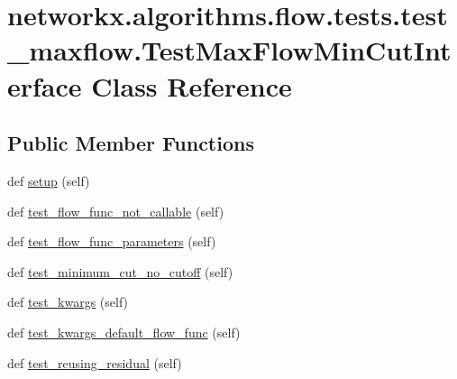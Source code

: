 \hypertarget{classnetworkx_1_1algorithms_1_1flow_1_1tests_1_1test__maxflow_1_1TestMaxFlowMinCutInterface}{}\section{networkx.\+algorithms.\+flow.\+tests.\+test\+\_\+maxflow.\+Test\+Max\+Flow\+Min\+Cut\+Interface Class Reference}
\label{classnetworkx_1_1algorithms_1_1flow_1_1tests_1_1test__maxflow_1_1TestMaxFlowMinCutInterface}
\subsection*{Public Member Functions}
\begin{DoxyCompactItemize}
\item 
def \hyperlink{classnetworkx_1_1algorithms_1_1flow_1_1tests_1_1test__maxflow_1_1TestMaxFlowMinCutInterface_aeada91b8743df6e54962f3b062716ac0}{setup} (self)
\item 
def \hyperlink{classnetworkx_1_1algorithms_1_1flow_1_1tests_1_1test__maxflow_1_1TestMaxFlowMinCutInterface_a7dd2ffe4b3489da58cb40f8c888df71e}{test\+\_\+flow\+\_\+func\+\_\+not\+\_\+callable} (self)
\item 
def \hyperlink{classnetworkx_1_1algorithms_1_1flow_1_1tests_1_1test__maxflow_1_1TestMaxFlowMinCutInterface_a3035ccbfe860caf1e4a82d6351e6154b}{test\+\_\+flow\+\_\+func\+\_\+parameters} (self)
\item 
def \hyperlink{classnetworkx_1_1algorithms_1_1flow_1_1tests_1_1test__maxflow_1_1TestMaxFlowMinCutInterface_a3612929bed394eb5e1f97c71276c99b5}{test\+\_\+minimum\+\_\+cut\+\_\+no\+\_\+cutoff} (self)
\item 
def \hyperlink{classnetworkx_1_1algorithms_1_1flow_1_1tests_1_1test__maxflow_1_1TestMaxFlowMinCutInterface_a61ea7043e8da6863093a61b8a0302069}{test\+\_\+kwargs} (self)
\item 
def \hyperlink{classnetworkx_1_1algorithms_1_1flow_1_1tests_1_1test__maxflow_1_1TestMaxFlowMinCutInterface_aa4c389d114f2605638516ef7199e664c}{test\+\_\+kwargs\+\_\+default\+\_\+flow\+\_\+func} (self)
\item 
def \hyperlink{classnetworkx_1_1algorithms_1_1flow_1_1tests_1_1test__maxflow_1_1TestMaxFlowMinCutInterface_ae21c51e9fbb89b3de9cfcdec3683cf9d}{test\+\_\+reusing\+\_\+residual} (self)
\end{DoxyCompactItemize}
